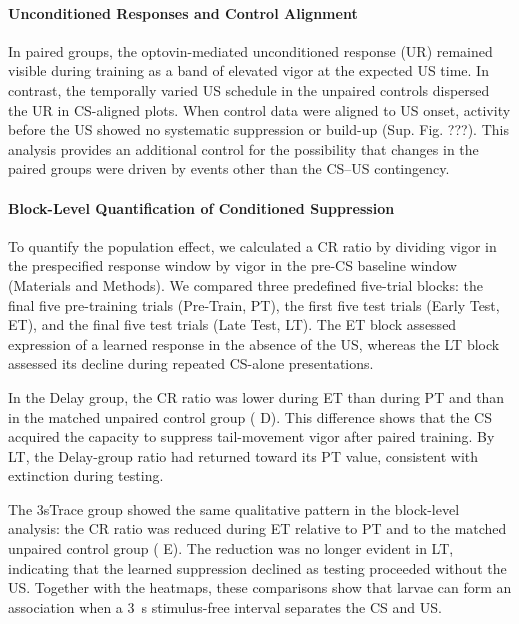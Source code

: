 \paragraph{Unconditioned Responses and Control Alignment}

In paired groups, the optovin-mediated unconditioned response (UR) remained visible during training as a band of elevated vigor at the expected US time. In contrast, the temporally varied US schedule in the unpaired controls dispersed the UR in CS-aligned plots. When control data were aligned to US onset, activity before the US showed no systematic suppression or build-up (Sup. Fig. ???). This analysis provides an additional control for the possibility that changes in the paired groups were driven by events other than the CS--US contingency.

\paragraph{Block-Level Quantification of Conditioned Suppression}

To quantify the population effect, we calculated a CR ratio by dividing vigor in the prespecified response window by vigor in the pre-CS baseline window (Materials and Methods). We compared three predefined five-trial blocks: the final five pre-training trials (Pre-Train, PT), the first five test trials (Early Test, ET), and the final five test trials (Late Test, LT). The ET block assessed expression of a learned response in the absence of the US, whereas the LT block assessed its decline during repeated CS-alone presentations.

In the Delay group, the CR ratio was lower during ET than during PT and than in the matched unpaired control group ( D). This difference shows that the CS acquired the capacity to suppress tail-movement vigor after paired training. By LT, the Delay-group ratio had returned toward its PT value, consistent with extinction during testing.

The 3sTrace group showed the same qualitative pattern in the block-level analysis: the CR ratio was reduced during ET relative to PT and to the matched unpaired control group ( E). The reduction was no longer evident in LT, indicating that the learned suppression declined as testing proceeded without the US. Together with the heatmaps, these comparisons show that larvae can form an association when a \SI{3}{\second} stimulus-free interval separates the CS and US.

